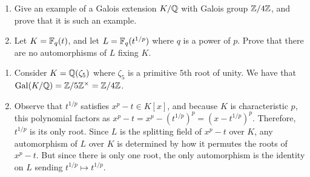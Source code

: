 %
\begin{question}[subtitle = August 2018 Problem 4,ID=Aug18_4]
\begin{enumerate}
    \item Give an example of a Galois extension $K/\mathbb{Q}$ with Galois group $\mathbb{Z}/4\mathbb{Z}$, and prove that it is such an example.
    \item Let $K = \mathbb{F}_q(t)$, and let $L = \mathbb{F}_q(t^{1/p})$ where $q$ is a power of $p$. Prove that there are no automorphisms of $L$ fixing $K$.
\end{enumerate}
\end{question}
\begin{solution}
\begin{enumerate}
    \item Consider $K=\mathbb{Q}(\zeta_5)$ where $\zeta_5$ is a primitive $5$th root of unity. We have that $\operatorname{Gal}(K/\mathbb{Q}) = \mathbb{Z}/5\mathbb{Z}^{\times} = \mathbb{Z}/4\mathbb{Z}$.
    \item Observe that $t^{1/p}$ satisfies $x^p-t \in K[x]$, and because $K$ is characteristic $p$, this polynomial factors as $x^p-t=x^p-(t^{1/p})^p = (x-t^{1/p})^p$. Therefore, $t^{1/p}$ is its only root. Since $L$ is the splitting field of $x^p-t$ over $K$, any automorphism of $L$ over $K$ is determined by how it permutes the roots of $x^p-t$. But since there is only one root, the only automorphism is the identity on $L$ sending $t^{1/p} \mapsto t^{1/p}$.
\end{enumerate}
\end{solution}

